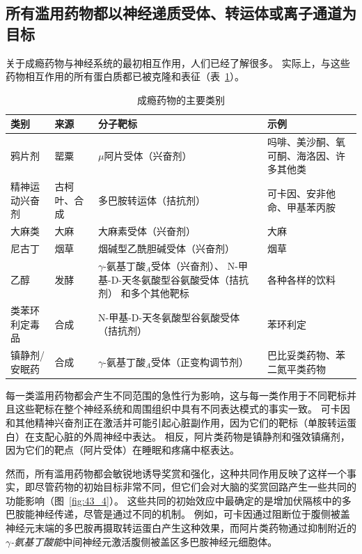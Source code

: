 \subsection{所有滥用药物都以神经递质受体、转运体或离子通道为目标}

关于成瘾药物与神经系统的最初相互作用，人们已经了解很多。
实际上，与这些药物相互作用的所有蛋白质都已被克隆和表征（表~\ref{tab:43_1}）。


\begin{table}[htbp]
	\caption{成瘾药物的主要类别} \label{tab:43_1} \centering
	\begin{tabular}{llll}
		\toprule
		类别 & 来源 & 分子靶标 & 示例 \\
		\midrule
		鸦片剂 & 罂粟 & $\mu$阿片受体（兴奋剂） & 吗啡、美沙酮、氧可酮、海洛因、许多其他类 \\
		精神运动兴奋剂 & 古柯叶、合成 & 多巴胺转运体（拮抗剂） & 可卡因、安非他命、甲基苯丙胺 \\
		大麻类 & 大麻 & 大麻素受体（兴奋剂） & 大麻 \\
		尼古丁 & 烟草 & 烟碱型乙酰胆碱受体（兴奋剂） & 烟草 \\
		乙醇 & 发酵 & \makecell[l]{$\gamma$-氨基丁酸$_A$受体（兴奋剂）、\\N-甲基-D-天冬氨酸型谷氨酸受体（拮抗剂）\\和多个其他靶标} & 各种各样的饮料 \\
		类苯环利定毒品 & 合成 & N-甲基-D-天冬氨酸型谷氨酸受体（拮抗剂） & 苯环利定 \\
		镇静剂/安眠药 & 合成 & $\gamma$-氨基丁酸$_A$受体（正变构调节剂） & 巴比妥类药物、苯二氮平类药物 \\
		\bottomrule
	\end{tabular}
\end{table}


每一类滥用药物都会产生不同范围的急性行为影响，这与每一类作用于不同靶标并且这些靶标在整个神经系统和周围组织中具有不同表达模式的事实一致。
可卡因和其他精神兴奋剂正在激活并可能引起心脏副作用，因为它们的靶标（单胺转运蛋白）在支配心脏的外周神经中表达。
相反，阿片类药物是镇静剂和强效镇痛剂，因为它们的靶点（阿片受体）在睡眠和疼痛中枢表达。


然而，所有滥用药物都会敏锐地诱导奖赏和强化，这种共同作用反映了这样一个事实，即尽管药物的初始目标非常不同，但它们会对大脑的奖赏回路产生一些共同的功能影响（图~\ref{fig:43_4}）。
这些共同的初始效应中最确定的是增加伏隔核中的多巴胺能神经传递，尽管是通过不同的机制。
例如，可卡因通过阻断位于腹侧被盖神经元末端的多巴胺再摄取转运蛋白产生这种效果，而阿片类药物通过抑制附近的\textit{$\gamma$-氨基丁酸能}中间神经元激活腹侧被盖区多巴胺神经元细胞体。


